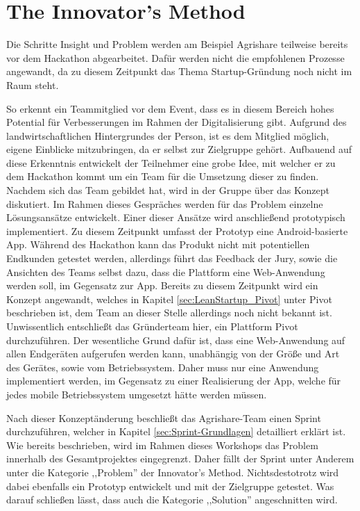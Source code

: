 \section{The Innovator's Method}
Die Schritte Insight und Problem werden am Beispiel Agrishare teilweise bereits vor dem Hackathon abgearbeitet. Dafür werden nicht die empfohlenen Prozesse angewandt, da zu diesem Zeitpunkt das Thema Startup-Gründung noch nicht im Raum steht.

So erkennt ein Teammitglied vor dem Event, dass es in diesem Bereich hohes Potential für Verbesserungen im Rahmen der Digitalisierung gibt. Aufgrund des landwirtschaftlichen Hintergrundes der Person, ist es dem Mitglied möglich, eigene Einblicke mitzubringen, da er selbst zur Zielgruppe gehört. Aufbauend auf diese Erkenntnis entwickelt der Teilnehmer eine grobe Idee, mit welcher er zu dem Hackathon kommt um ein Team für die Umsetzung dieser zu finden. Nachdem sich das Team gebildet hat, wird in der Gruppe über das Konzept diskutiert. Im Rahmen dieses Gespräches werden für das Problem einzelne Lösungsansätze entwickelt. Einer dieser Ansätze wird anschließend prototypisch implementiert. Zu diesem Zeitpunkt umfasst der Prototyp eine Android-basierte App. Während des Hackathon kann das Produkt nicht mit potentiellen Endkunden getestet werden, allerdings führt das Feedback der Jury, sowie die Ansichten des Teams selbst dazu, dass die Plattform eine Web-Anwendung werden soll, im Gegensatz zur App. Bereits zu diesem Zeitpunkt wird ein Konzept angewandt, welches in Kapitel \ref{sec:LeanStartup_Pivot} unter Pivot beschrieben ist, dem Team an dieser Stelle allerdings noch nicht bekannt ist. Unwissentlich entschließt das Gründerteam hier, ein Plattform Pivot durchzuführen. Der wesentliche Grund dafür ist, dass eine Web-Anwendung auf allen Endgeräten aufgerufen werden kann, unabhängig von der Größe und Art des Gerätes, sowie vom Betriebssystem. Daher muss nur eine Anwendung implementiert werden, im Gegensatz zu einer Realisierung der App, welche für jedes mobile Betriebssystem umgesetzt hätte werden müssen.

Nach dieser Konzeptänderung beschließt das Agrishare-Team einen Sprint durchzuführen, welcher in Kapitel \ref{sec:Sprint-Grundlagen} detailliert erklärt ist. Wie bereits beschrieben, wird im Rahmen dieses Workshops das Problem innerhalb des Gesamtprojektes eingegrenzt. Daher fällt der Sprint unter Anderem unter die Kategorie ,,Problem'' der Innovator's Method. Nichtsdestotrotz wird dabei ebenfalls ein Prototyp entwickelt und mit der Zielgruppe getestet. Was darauf schließen lässt, dass auch die Kategorie ,,Solution'' angeschnitten wird.